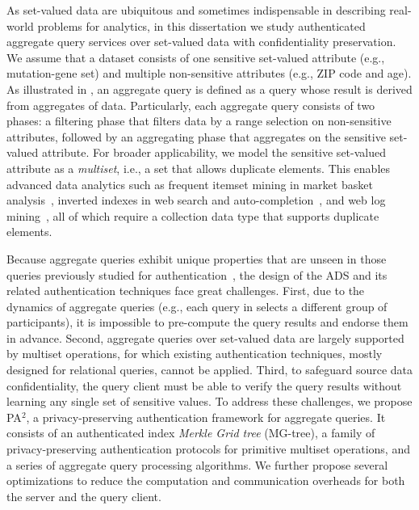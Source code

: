 As set-valued data are ubiquitous and sometimes indispensable in describing real-world problems for analytics, in this dissertation we study authenticated aggregate query services over set-valued data with confidentiality preservation. We assume that a dataset consists of one sensitive set-valued attribute (e.g., mutation-gene set) and multiple non-sensitive attributes (e.g., ZIP code and age). As illustrated in , an aggregate query is defined as a query whose result is derived from aggregates of data. Particularly, each aggregate query consists of two phases: a filtering phase that filters data by a range selection on non-sensitive attributes, followed by an aggregating phase that aggregates on the sensitive set-valued attribute. For broader applicability, we model the sensitive set-valued attribute as a \emph{multiset}, i.e., a set that allows duplicate elements. This enables advanced data analytics such as frequent itemset mining in market basket analysis~\cite{Agrawal:1994:FAM:645920.672836}, inverted indexes in web search and auto-completion~\cite{10.1145/1148170.1148234}, and web log mining~\cite{10.14778/2212351.2212353}, all of which require a collection data type that supports duplicate elements.

Because aggregate queries exhibit unique properties that are unseen in those queries previously studied for authentication~\cite{10.1109/ICDE.2004.1320027,10.1145/1142473.1142488,10.1007/s00778-008-0113-2}, the design of the ADS and its related authentication techniques face great challenges. First, due to the dynamics of aggregate queries (e.g., each query in  selects a different group of participants), it is impossible to pre-compute the query results and endorse them in advance. Second, aggregate queries over set-valued data are largely supported by multiset operations, for which existing authentication techniques, mostly designed for relational queries, cannot be applied. Third, to safeguard source data confidentiality, the query client must be able to verify the query results without learning any single set of sensitive values. To address these challenges, we propose PA$^2$, a privacy-preserving authentication framework for aggregate queries. It consists of an authenticated index \emph{Merkle Grid tree} (MG-tree), a family of privacy-preserving authentication protocols for primitive multiset operations, and a series of aggregate query processing algorithms. We further propose several optimizations to reduce the computation and communication overheads for both the server and the query client.

